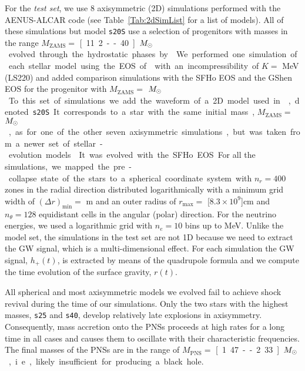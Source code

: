 {For the {\it test set}, we use $8$ axisymmetric (2D) simulations performed with the {\sc AENUS-ALCAR} code
(see Table~\ref{Tab:2dSimList} for a list of models).
All of these simulations but model \texttt{s20S} use a selection of progenitors with masses in the range} $M_{\mathrm{ZAMS}}=$ \unit[11.2 -- 40]{$M_{\odot}$}
 evolved through the hydrostatic phases by
\cite{Woosley_Heger_Weaver__2002__ReviewsofModernPhysics__The_evolution_and_explosion_of_massive_stars}.
We performed one simulation of each stellar model using the EOS of \cite{Lattimer_Swesty__1991__NuclearPhysicsA__LS-EOS} with
an incompressibility of $K=$ \unit[220]{MeV} (LS220) and added
comparison simulations with the SFHo EOS
\cite{Steiner_et_al__2013__apj__Core-collapseSupernovaEquationsofStateBasedonNeutronStarObservations}
and the GShen EOS 
\cite{Shen_et_al__2011__prc__Newequationofstateforastrophysicalsimulations}
for the {progenitor} with $M_{\mathrm{ZAMS}}=$ \unit[15]{$M_{\odot}$}. To this set of
simulations we add the waveform of a 2D model used in
\cite{Torres:2019a}, denoted \texttt{s20S}. It corresponds to a star
with the same initial mass, $M_{\mathrm{ZAMS}}=$ \unit[20]{$M_{\odot}$}, as for
one of the other seven axisymmetric simulations, but was taken from a
newer set of stellar-evolution models
\cite{Woosley_Heger__2007__physrep__Nucleosynthesisandremnantsinmassivestarsofsolarmetallicity}.
It was evolved with the SFHo EOS.


{For all the simulations,} we mapped the pre-collapse state of the stars to a spherical
coordinate system with $n_r = 400$ zones in the radial direction
distributed logarithmically with a minimum grid width of
$(\Delta r)_{\mathrm{min}}=$ \unit[400]{m} and an outer radius of
$r_{\mathrm{max}} =$ \unit[$8.3 \times 10^{9}$]{cm} and
$n_{\theta} = 128$ equidistant cells in the angular (polar) direction. For the
neutrino energies, we used a logarithmic grid with $n_e = 10$ bins up
to \unit[240]{MeV}.
{Unlike the model set, the simulations in the test set are not 1D because we need to 
extract the GW signal, which is a multi-dimensional effect. For each simulation
the GW signal, $h_+(t)$, is extracted by means of the quadrupole formula and we compute the 
time evolution of the surface gravity, $r(t)$.}

All spherical and most axisymmetric models we evolved fail to achieve shock
revival during the time of our simulations. Only the two stars with
the highest masses, \texttt{s25} and \texttt{s40}, develop relatively
late explosions in axisymmetry. Consequently, mass accretion onto the
PNSs proceeds at high rates for a long time in all cases and causes
them to oscillate with their characteristic frequencies. The final
masses of the PNSs are in the range of
$M_{\mathrm{PNS}} =$ \unit[1.47 -- 2.33]{$M_{\odot}$}, i.e., likely insufficient for
producing a black hole.


 	

